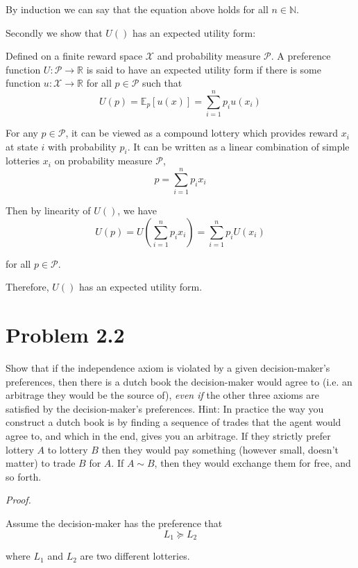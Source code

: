 \documentclass[a4paper]{article}
\begin{document}
By induction we can say that the equation above holds for all $n\in\mathbb{N}$.\newline

Secondly we show that $U()$ has an expected utility form:\newline

Defined on a finite reward space $\mathcal{X}$ and probability measure $\mathcal{P}$. A preference function $U:\mathcal{P}\rightarrow\mathbb{R}$ is said to have an expected utility form if there is some function $u:\mathcal{X}\rightarrow\mathbb{R}$ for all $p\in\mathcal{P}$ such that
\[U(p)=\mathbb{E}_p[u(x)]=\sum_{i=1}^n {p_i u(x_i)}\]

For any $p\in\mathcal{P}$, it can be viewed as a compound lottery which provides reward $x_i$ at state $i$ with probability $p_i$. It can be written as a linear combination of simple lotteries $x_i$ on probability measure $\mathcal{P}$,
\[p=\sum_{i=1}^n {p_i x_i}\]

Then by linearity of $U()$, we have
\[U(p)=U(\sum_{i=1}^n {p_i x_i})=\sum_{i=1}^n {p_i U(x_i)}\]

for all $p\in\mathcal{P}$.\newline

Therefore, $U()$ has an expected utility form.

\section{Problem 2.2}

Show that if the independence axiom is violated by a given decision-maker’s preferences, then there is a dutch book the decision-maker would agree to (i.e. an arbitrage they would be the source of), \textit{even if} the other three axioms are satisfied by the decision-maker’s preferences. Hint: In practice the way you construct a dutch book is by finding a sequence of trades that the agent would agree to, and which in the end, gives you an arbitrage. If they strictly prefer lottery $A$ to lottery $B$ then they would pay something (however small, doesn’t matter) to trade $B$ for $A$. If $A \sim B$, then they would exchange them for free, and so forth.\newline

\textit{Proof.}\newline

Assume the decision-maker has the preference that
\[L_1 \succeq L_2\]

where $L_1$ and $L_2$ are two different lotteries.\newline
\end{document}
